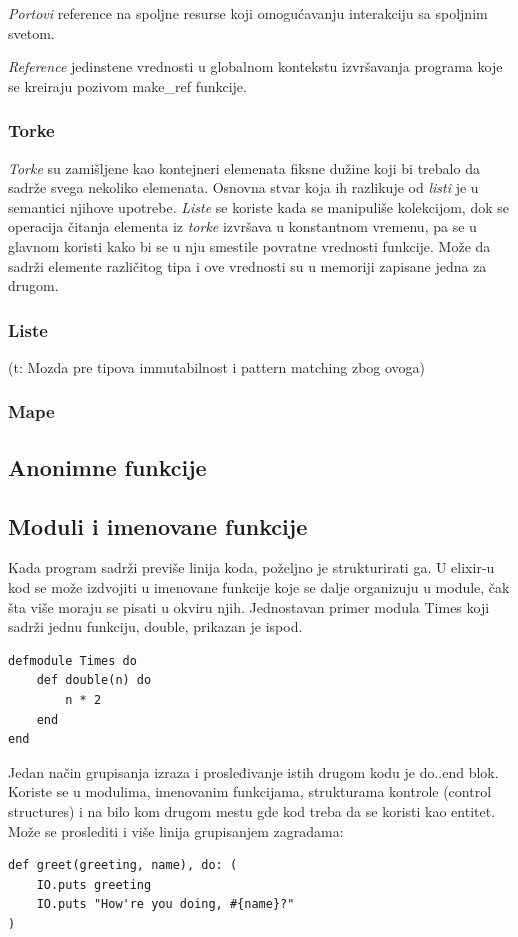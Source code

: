 \documentclass[a4paper]{article}
\begin{document}
\textit{Portovi} reference na spoljne resurse koji omogućavanju interakciju sa spoljnim svetom.

\textit{Reference} jedinstene vrednosti u globalnom kontekstu izvršavanja programa koje se kreiraju pozivom make\_ref funkcije.

\subsubsection{Torke}
\label{sec:ime}
\textit{Torke} su zamišljene kao kontejneri elemenata fiksne dužine koji bi trebalo da sadrže svega nekoliko elemenata. Osnovna stvar koja ih razlikuje od \textit{listi} je u semantici njihove upotrebe. \textit{Liste} se koriste kada se manipuliše kolekcijom, dok se operacija čitanja elementa iz \textit{torke} izvršava u konstantnom vremenu, pa se u glavnom koristi kako bi se u nju smestile povratne vrednosti funkcije. Može da sadrži elemente različitog tipa i ove vrednosti su u memoriji zapisane jedna za drugom.

\subsubsection{Liste}
\label{sec:ime}
(t: Mozda pre tipova immutabilnost i pattern matching zbog ovoga)
\subsubsection{Mape}
\label{sec:ime}

\subsection{Anonimne funkcije}
\label{sec:ime}

\subsection{Moduli i imenovane funkcije}
\label{sec:ime}
Kada program sadrži previše linija koda, poželjno je strukturirati ga. U elixir-u kod se može izdvojiti u imenovane funkcije koje se dalje organizuju u module, čak šta više moraju se pisati u okviru njih. 
Jednostavan primer modula Times koji sadrži jednu funkciju, double, prikazan je ispod. 
\begin{verbatim}
defmodule Times do
    def double(n) do
        n * 2
    end
end   
\end{verbatim}

Jedan način grupisanja izraza i prosleđivanje istih drugom kodu je do..end blok. Koriste se u modulima, imenovanim funkcijama, strukturama kontrole (control structures) i na bilo kom drugom mestu gde kod treba da se koristi kao entitet. Može se proslediti i više linija grupisanjem zagradama:
\begin{verbatim}
def greet(greeting, name), do: (
    IO.puts greeting
    IO.puts "How're you doing, #{name}?"
)
\end{verbatim}
\end{document}
